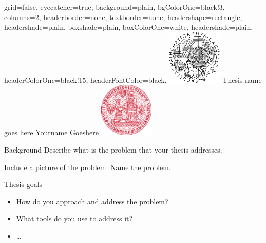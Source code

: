 \documentclass[portrait,a0paper,fontscale=0.25]{baposter}
\begin{document}
\color{black!80} %
\begin{poster}{grid=false,
	eyecatcher=true,
	background=plain,
	bgColorOne=black!3, %
	columns=2,
	headerborder=none,
	textborder=none,
	headershape=rectangle,
	headershade=plain,
	boxshade=plain,
	boxColorOne=white,
	headershade=plain,
	headerColorOne=black!15, %
	headerFontColor=black,
	}%
	{\includegraphics[height=7em]{logos/mff-black.pdf}}
	{Thesis name goes here}
	{\vspace{1ex} Yourname Goeshere}
	{\includegraphics[height=7em]{logos/uk-red.pdf}}


%
%

\begin{posterbox}[column=0,name=background]{Background}
Describe what is the problem that your thesis addresses.

Include a picture of the problem. Name the problem.

\begin{center}\end{center}
\end{posterbox}

\begin{posterbox}[column=0, name=goals, below=background, headerColorOne=cyan!60, boxColorOne=cyan!20]{Thesis goals}
\begin{itemize}
\item How do you approach and address the problem?
\item What tools do you use to address it?
\item \dots
\end{itemize}


\end{posterbox}
\end{poster}
\end{document}
